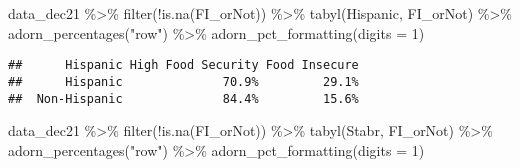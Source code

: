 \documentclass[
]{article}
\newenvironment{Shaded}{\begin{snugshade}}{\end{snugshade}}
\newcommand{\AttributeTok}[1]{\textcolor[rgb]{0.77,0.63,0.00}{#1}}
\newcommand{\DecValTok}[1]{\textcolor[rgb]{0.00,0.00,0.81}{#1}}
\newcommand{\FunctionTok}[1]{\textcolor[rgb]{0.00,0.00,0.00}{#1}}
\newcommand{\NormalTok}[1]{#1}
\newcommand{\SpecialCharTok}[1]{\textcolor[rgb]{0.00,0.00,0.00}{#1}}
\newcommand{\StringTok}[1]{\textcolor[rgb]{0.31,0.60,0.02}{#1}}
\begin{document}
\begin{Shaded}
\begin{Highlighting}[]
\NormalTok{data\_dec21 }\SpecialCharTok{\%\textgreater{}\%} \FunctionTok{filter}\NormalTok{(}\SpecialCharTok{!}\FunctionTok{is.na}\NormalTok{(FI\_orNot)) }\SpecialCharTok{\%\textgreater{}\%} 
\FunctionTok{tabyl}\NormalTok{(Hispanic, FI\_orNot) }\SpecialCharTok{\%\textgreater{}\%} 
  \FunctionTok{adorn\_percentages}\NormalTok{(}\StringTok{"row"}\NormalTok{) }\SpecialCharTok{\%\textgreater{}\%} 
  \FunctionTok{adorn\_pct\_formatting}\NormalTok{(}\AttributeTok{digits =} \DecValTok{1}\NormalTok{)}
\end{Highlighting}
\end{Shaded}

\begin{verbatim}
##      Hispanic High Food Security Food Insecure
##      Hispanic              70.9%         29.1%
##  Non-Hispanic              84.4%         15.6%
\end{verbatim}

\begin{Shaded}
\begin{Highlighting}[]
\NormalTok{data\_dec21 }\SpecialCharTok{\%\textgreater{}\%} \FunctionTok{filter}\NormalTok{(}\SpecialCharTok{!}\FunctionTok{is.na}\NormalTok{(FI\_orNot)) }\SpecialCharTok{\%\textgreater{}\%} 
\FunctionTok{tabyl}\NormalTok{(Stabr, FI\_orNot) }\SpecialCharTok{\%\textgreater{}\%} 
  \FunctionTok{adorn\_percentages}\NormalTok{(}\StringTok{"row"}\NormalTok{) }\SpecialCharTok{\%\textgreater{}\%} 
  \FunctionTok{adorn\_pct\_formatting}\NormalTok{(}\AttributeTok{digits =} \DecValTok{1}\NormalTok{)}
\end{Highlighting}
\end{Shaded}
\end{document}
